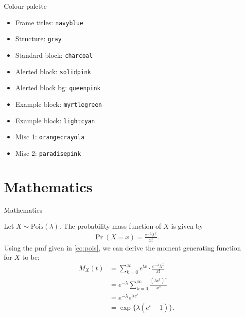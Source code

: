 \documentclass[]{beamer}
\begin{document}
\begin{frame}{Colour palette}

\begin{itemize}
	\item {\color{navyblue} Frame titles: \texttt{navyblue}}
	\item {\color{gray} Structure: \texttt{gray}}
	\item {\color{charcoal} Standard block: \texttt{charcoal}}
	\item {\color{solidpink} Alerted block: \texttt{solidpink}}
	\item {\color{queenpink} Alerted block bg: \texttt{queenpink}}
	\item {\color{myrtlegreen} Example block: \texttt{myrtlegreen}}
	\item {\color{lightcyan} Example block: \texttt{lightcyan}}
	\item {\color{orangecrayola} Misc 1: \texttt{orangecrayola}}
	\item {\color{paradisepink} Misc 2: \texttt{paradisepink}}
\end{itemize}

\end{frame}

\section{Mathematics}

\begin{frame}{Mathematics}

	Let $X\sim\mathrm{Pois}(\lambda)$. 
	The probability mass function of $X$ is given by
	\begin{align}\label{eq:pois}
		\Pr(X=x) = \frac{e^{-\lambda}\lambda^x}{x!}.
	\end{align}
	Using the pmf given in \eqref{eq:pois}, we can derive the moment generating function for $X$ to be:
	\begin{align*}
		M_X(t) 
		&= \sum_{k=0}^\infty e^{tx} \cdot \frac{e^{-\lambda}\lambda^x}{x!} \\
		&= e^{-\lambda} \sum_{k=0}^\infty  \frac{(\lambda e^t)^x}{x!} \\
		&= e^{-\lambda}  e^{\lambda e^t} \\
		&= \exp\{\lambda(e^t - 1) \}.
	\end{align*}

\end{frame}
\end{document}
